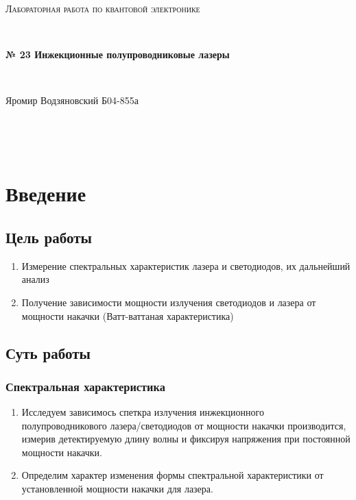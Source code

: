 \documentclass[a4paper]{article}
\begin{document}
\graphicspath{ {pictures/} }
\begin{center}
    {\scshape\Large Лабораторная работа по квантовой электронике} \par

    \

    {\huge\bfseries № 23 Инжекционные полупроводниковые лазеры} \par 

    \

    {\large Яромир Водзяновский Б04-855а}
\end{center}

\

\
\section{Введение}

    \subsection{Цель работы}
        
        \begin{enumerate}
            \item Измерение спектральных характеристик лазера и светодиодов, их дальнейший анализ
            \item Получение зависимости мощности излучения светодиодов и лазера от мощности накачки (Ватт-ваттаная характеристика)
        \end{enumerate}
        
    \subsection{Суть работы}
        \subsubsection{Спектральная характеристика}
            
        \begin{enumerate}
            \item Исследуем зависимось спеткра излучения инжекционного полупроводникового лазера/светодиодов от мощности накачки производится, измерив детектируемую длину волны и фиксируя напряжения при постоянной мощности накачки.
            \item Определим характер изменения формы спектральной характеристики от установленной мощности накачки для лазера.
        \end{enumerate}
            
\end{document}
